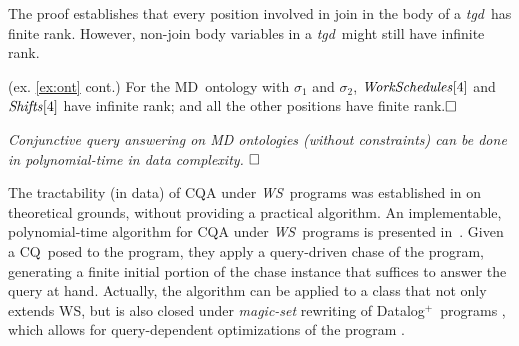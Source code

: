 \documentclass[format=acmsmall, review=false, screen=true]{acmart}
\newcommand{\ignore}[1]{}
\newcommand{\cq}{CQ}
\newcommand{\boxtheorem}{\ensuremath{\hfill \Box}}
\newcommand{\mc}[1]{\mathcal{ #1}}
\newcommand{\nit}[1]{{\it #1}}
\newcommand{\dplus}{{Datalog}$^+$}
\newcommand{\m}{\;\!\!}
\newcommand{\WS}{{\em W\m{}S}}
\newcommand{\md}{MD}
\newcommand{\tgd}{{\em tgd}}
\newcommand{\blue}[1]{{#1}}
\newcommand{\comlb}[1]{{\vspace{2mm}\noindent \bf \blue{COMM(LEO):}}~ #1 \hfill {\bf
    END.}\\}
\begin{document}

The proof establishes that every position involved in join in the body of a \tgd \ has finite rank. However, non-join body variables in a \tgd \ might still have infinite rank.

\begin{example}\label{ex:ranks} (ex. \ref{ex:ont} cont.) For  the \md \ ontology  with $\sigma_1$ and $\sigma_2$, $\nit{WorkSchedules}[4]$ and $\nit{Shifts}[4]$ have infinite rank; and all the other positions have finite rank.\boxtheorem
\end{example}


\ignore{+++{A \md \ ontology includes dimensional rules of the form (\ref{frm:dimensional-rule}): $R_1(\bar{e}_1;\bar{a}_1),...,R_n(\bar{e}_n;\bar{a}_n),P_1(e_1,e'_1),...,P_m(e_m,e'_m)  \rightarrow \exists \bar{a}_z \ R_k(\bar{e}_k;\bar{a}_k),$ in which (a) $\bar{a}_z \subseteq \bar{a}_k$, (b) $\bar{e}_k \subseteq \bar{e}_1 \cup ... \cup \bar{e}_n \cup \{e_1,...,e_m, e'_1,...,e'_m\}$, (c) $\bar{a}_k \! \smallsetminus \! \bar{a}_z \subseteq \bar{a}_1 \cup ... \cup \bar{a}_n$, and (d) repeated variables in bodies are only in positions of categorical attributes.

In particular, (a) guarantees that no null values are invented in the categorical positions during the chase of $\mc{O}^\mc{M}$. Also, (b) ensures that the variables in the non-categorical positions in the bodies do not appear in the heads in the categorical positions. As a result, no null value can replace a variable in a categorical position during the chase. This, in addition with (d), proves that no null value can replace a repeated body variable, which proves a set of dimensional rules is \WS.\boxtheorem}\\ +++}



\begin{corollary} \label{cor:ws} \em Conjunctive query answering on MD ontologies (without constraints) can be done in polynomial-time in data complexity. \boxtheorem %
\end{corollary}

The tractability (in data) of CQA under \WS \ programs was established in \cite{cali12} on theoretical grounds, without providing a practical algorithm. An implementable, polynomial-time algorithm
for CQA under \WS \ programs is presented in~\cite{milani16rr}. Given a \cq \ posed to the program, they apply a query-driven chase of the program, generating a finite initial portion of the chase instance that
 suffices to answer the query at hand. Actually, the algorithm can be applied to a class that not only extends WS, but is also closed under {\em magic-set} rewriting of \dplus \ programs \cite{alviano12-datalog}, which allows for query-dependent optimizations of the program
 \cite{milani16rr}.
\end{document}
